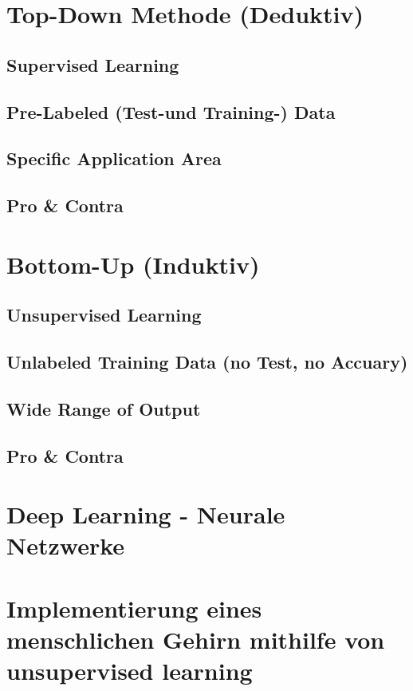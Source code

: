 \documentclass[12pt,german,ngerman]{report}
\begin{document}
    \section{Top-Down Methode (Deduktiv)}
        \subsection{Supervised Learning}
        \subsection{Pre-Labeled (Test-und Training-) Data}
        \subsection{Specific Application Area}
        \subsection{Pro \& Contra}
        
    \section{Bottom-Up (Induktiv)}
        \subsection{Unsupervised Learning}
        \subsection{Unlabeled Training Data (no Test, no Accuary)}
        \subsection{Wide Range of Output}
        \subsection{Pro \& Contra}

    \section{Deep Learning - Neurale Netzwerke}
        \section{Implementierung eines menschlichen Gehirn mithilfe von unsupervised learning}
\end{document}
